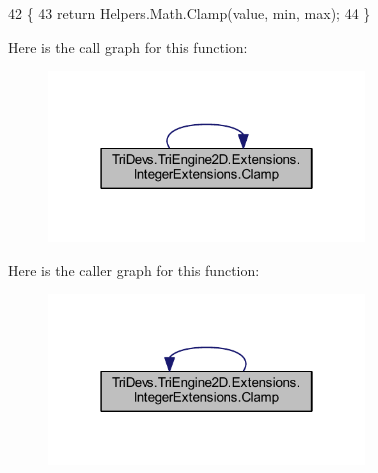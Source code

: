 \begin{DoxyCode}
42         \{
43             \textcolor{keywordflow}{return} Helpers.Math.Clamp(value, min, max);
44         \}
\end{DoxyCode}


Here is the call graph for this function\-:
\nopagebreak
\begin{figure}[H]
\begin{center}
\leavevmode
\includegraphics[width=238pt]{class_tri_devs_1_1_tri_engine2_d_1_1_extensions_1_1_integer_extensions_a3880786c9330dbbbdb27693548946679_cgraph}
\end{center}
\end{figure}




Here is the caller graph for this function\-:
\nopagebreak
\begin{figure}[H]
\begin{center}
\leavevmode
\includegraphics[width=238pt]{class_tri_devs_1_1_tri_engine2_d_1_1_extensions_1_1_integer_extensions_a3880786c9330dbbbdb27693548946679_icgraph}
\end{center}
\end{figure}


